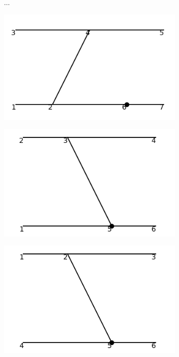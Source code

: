 \documentclass[11pt,a4paper,twoside,pdf]{article}
\numberwithin{equation}{section}
\begin{document}
\begin{figure}[h!]
    \begin{subfigure}[t]{0.1\textwidth}
        \centering
        {\LARGE $\ldots$}
    \end{subfigure}
    \vspace{0.5cm}

    \begin{subfigure}[t]{0.16\textwidth}
        \centering
        \includegraphics[width=\textwidth]{plots/order4_2to2/counterterms/1.png}
    \end{subfigure}%
    \hfill
    \begin{subfigure}[t]{0.16\textwidth}
        \centering
        \includegraphics[width=\textwidth]{plots/order4_2to2/counterterms/2.png}
    \end{subfigure}
    \hfill
    \begin{subfigure}[t]{0.16\textwidth}
        \centering
        \includegraphics[width=\textwidth]{plots/order4_2to2/counterterms/3.png}

\end{subfigure}
\end{figure}
\end{document}
